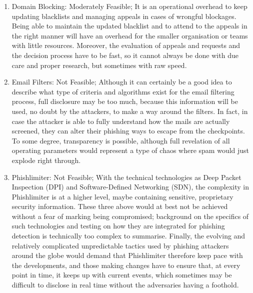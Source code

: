 \begin{enumerate}
     \item Domain Blocking: Moderately Feasible; It is an operational overhead to keep updating blacklists and managing appeals in cases of wrongful blockages. Being able to maintain the updated blacklist and to attend to the appeals in the right manner will have an overhead for the smaller organisation or teams with little resources. Moreover, the evaluation of appeals and requests and the decision process have to be fast, so it cannot always be done with due care and proper research, but sometimes with raw speed.
     
    \item Email Filters: Not Feasible;  Although it can certainly be a good idea to describe what type of criteria and algorithms exist for the email filtering process, full disclosure may be too much, because this information will be used, no doubt by the attackers, to make a way around the filters. In fact, in case the attacker is able to fully understand how the mails are actually screened, they can alter their phishing ways to escape from the checkpoints. To some degree, transparency is possible, although full revelation of all operating parameters would represent a type of chaos where spam would just explode right through.
    
   
    \item Phishlimiter: Not Feasible; With the technical technologies as Deep Packet Inspection (DPI) and Software-Defined Networking (SDN), the complexity in Phishlimiter is at a higher level, maybe containing sensitive, proprietary security information. These three above would at best not be achieved without a fear of marking being compromised; background on the specifics of such technologies and testing on how they are integrated for phishing detection is technically too complex to summarise. Finally, the evolving and relatively complicated unpredictable tactics used by phishing attackers around the globe would demand that Phishlimiter therefore keep pace with the developments, and those making changes have to ensure that, at every point in time, it keeps up with current events, which sometimes may be difficult to disclose in real time without the adversaries having a foothold.
    
\end{enumerate}
